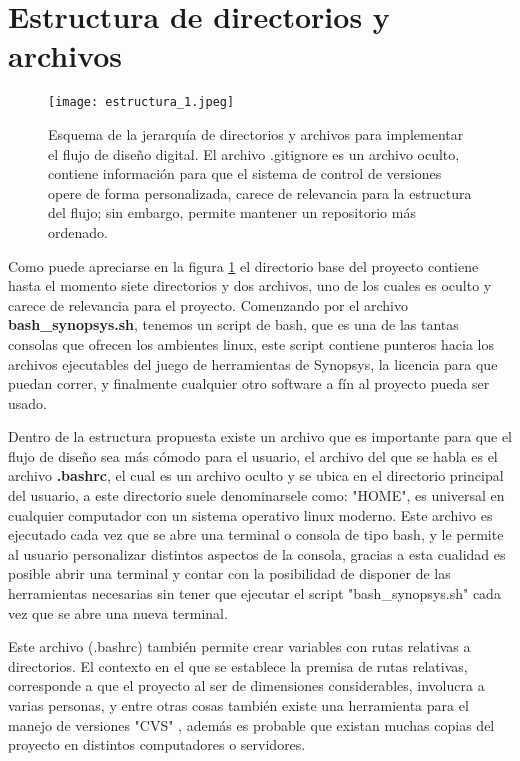 \section{Estructura de directorios y archivos}

\begin{figure}[h]
\texttt{[image: estructura\_1.jpeg]}
\centering
\caption{Esquema de la jerarquía de directorios y archivos para implementar el flujo de diseño digital. El archivo .gitignore es un archivo oculto, contiene información para que el sistema de control de versiones opere de forma personalizada, carece de relevancia para la estructura del flujo; sin embargo, permite mantener un repositorio más ordenado. \cite{website:gitignore, website:cvs}}
\label{directorios}
\end{figure}

Como puede apreciarse en la figura \ref{directorios} el directorio base del proyecto contiene hasta el momento siete directorios y dos archivos, uno de los cuales es oculto y carece de relevancia para el proyecto. Comenzando por el archivo \textbf{bash\_synopsys.sh}, tenemos un script de bash, que es una de las tantas consolas que ofrecen los ambientes linux, este script contiene punteros hacia los archivos ejecutables del juego de herramientas de Synopsys, la licencia para que puedan correr, y finalmente cualquier otro software a fín al proyecto pueda ser usado.

Dentro de la estructura propuesta existe un archivo que es importante para que el flujo de diseño sea más cómodo para el usuario, el archivo del que se habla es el archivo \textbf{.bashrc}, el cual es un archivo oculto y se ubica en el directorio principal del usuario, a este directorio suele denominarsele como: "HOME", es universal en cualquier computador con un sistema operativo linux moderno. Este archivo es ejecutado cada vez que se abre una terminal o consola de tipo bash, y le permite al usuario personalizar distintos aspectos de la consola, gracias a esta cualidad es posible abrir una terminal y contar con la posibilidad de disponer de las herramientas necesarias sin tener que ejecutar el script "bash\_synopsys.sh" cada vez que se abre una nueva terminal.

Este archivo (.bashrc) también permite crear variables con rutas relativas a directorios. El contexto en el que se establece la premisa de rutas relativas, corresponde a que el proyecto al ser de dimensiones considerables, involucra a varias personas, y entre otras cosas también existe una herramienta para el manejo de versiones "CVS" \cite{website:cvs}, además es probable que existan muchas copias del proyecto en distintos computadores o servidores.

